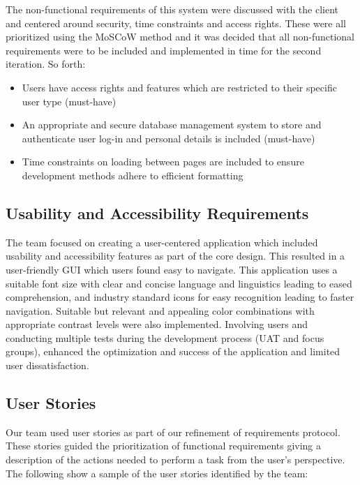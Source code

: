 \documentclass[11pt, english]{article}
\begin{document}
	The non-functional requirements of this system were discussed with the client and centered around security, time constraints and access rights. These were all prioritized using the MoSCoW method and it was decided that all non-functional requirements were to be included and implemented in time for the second iteration. So forth:

	\begin{itemize}
        \setlength\itemsep{0cm}
		\item Users have access rights and features which are restricted to their specific user type (must-have)
		\item An appropriate and secure database management system to store and authenticate user log-in and personal details is included (must-have)
                \item Time constraints on loading between pages are included to ensure development methods adhere to efficient formatting
        \end{itemize}

	\subsection{Usability and Accessibility Requirements}

	The team focused on creating a user-centered application which included usability and accessibility features as part of the core design. This resulted in a user-friendly GUI which users found easy to navigate. This application uses a suitable font size with clear and concise language and linguistics leading to eased comprehension, and industry standard icons for easy recognition leading to faster navigation. Suitable but relevant and appealing color combinations with appropriate contrast levels were also implemented. Involving users and conducting multiple tests during the development process (UAT and focus groups), enhanced the optimization and success of the application and limited user dissatisfaction.

	\subsection{User Stories}

	Our team used user stories as part of our refinement of requirements protocol. These stories guided the prioritization of functional requirements giving a description of the actions needed to perform a task from the user's perspective. The following show a sample of the user stories identified by the team:
\end{document}
